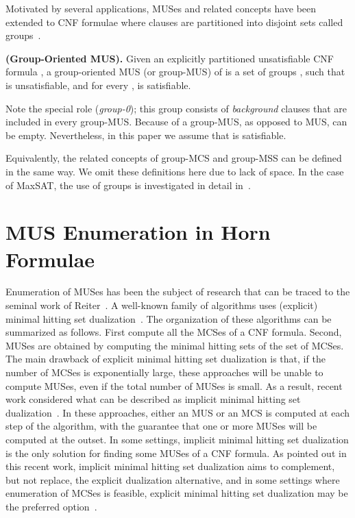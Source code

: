 \documentclass{llncs}
\begin{document}
Motivated by several applications, MUSes and related concepts have
been extended to CNF formulae where clauses are partitioned into
disjoint sets called groups~\cite{liffiton-jar08}.

\begin{definition} \label{def:gmus}
\textbf{(Group-Oriented MUS).} Given an explicitly partitioned unsatisfiable CNF formula , a group-oriented MUS (or group-MUS) of  is a set of groups , such that  is unsatisfiable, and for every ,  is satisfiable.
\end{definition}

Note the special role  (\textit{group-0}); this group consists of \textit{background} clauses that are included in every group-MUS. Because of  a group-MUS, as opposed to MUS, can be empty. Nevertheless, in this paper we assume that  is satisfiable.

Equivalently, the related concepts of group-MCS and group-MSS can be
defined in the same way. We omit these definitions here due to lack of
space. In the case of MaxSAT, the use of groups is investigated in
detail in~\cite{hmms-aicomm15}.

 
\section{MUS Enumeration in Horn Formulae} \label{sec:hmusenum}

Enumeration of MUSes has been the subject of research that can be
traced to the seminal work of Reiter~\cite{reiter-aij87}.
A well-known family of algorithms uses (explicit) minimal hitting set
dualization~\cite{lozinskii-jetai03,stuckey-padl05,liffiton-jar08}. The
organization of these algorithms can be summarized as follows. First
compute all the MCSes of a CNF formula. Second, MUSes are obtained by
computing the minimal hitting sets of the set of MCSes.
The main drawback of explicit minimal hitting set dualization is that,
if the number of MCSes is exponentially large, these approaches will
be unable to compute MUSes, even if the total number of MUSes is
small.
As a result, recent work considered what can be described as implicit
minimal hitting set
dualization~\cite{liffiton-cpaior13,pms-aaai13,lpmms-cj15}. In these
approaches, either an MUS or an MCS is computed at each step of the
algorithm, with the guarantee that one or more MUSes will be computed
at the outset. In some settings, implicit minimal hitting set
dualization is the only solution for finding some MUSes of a CNF
formula.
As pointed out in this recent work, implicit minimal hitting set
dualization aims to complement, but not replace, the explicit
dualization alternative, and in some settings where enumeration of
MCSes is feasible, explicit minimal hitting set dualization may be the
preferred option~\cite{pms-aaai13,lpmms-cj15}.
\end{document}
